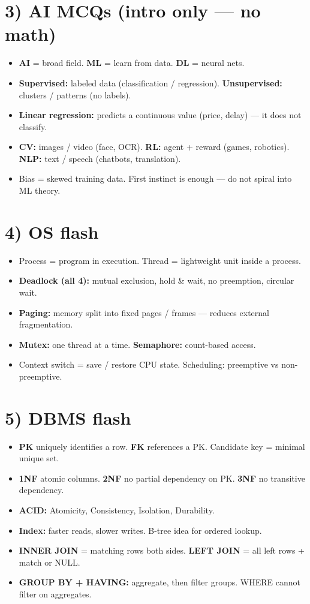 \documentclass[a4paper,9pt]{extarticle}
\begin{document}
\section{3) AI MCQs (intro only --- no math)}
\begin{itemize}
  \item \textbf{AI} = broad field. \textbf{ML} = learn from data. \textbf{DL} = neural nets.
  \item \textbf{Supervised:} labeled data (classification / regression). \textbf{Unsupervised:} clusters / patterns (no labels).
  \item \textbf{Linear regression:} predicts a continuous value (price, delay) --- it does not classify.
  \item \textbf{CV:} images / video (face, OCR). \textbf{RL:} agent + reward (games, robotics). \textbf{NLP:} text / speech (chatbots, translation).
  \item Bias = skewed training data. First instinct is enough --- do not spiral into ML theory.
\end{itemize}

\section{4) OS flash}
\begin{itemize}
  \item Process = program in execution. Thread = lightweight unit inside a process.
  \item \textbf{Deadlock (all 4):} mutual exclusion, hold \& wait, no preemption, circular wait.
  \item \textbf{Paging:} memory split into fixed pages / frames --- reduces external fragmentation.
  \item \textbf{Mutex:} one thread at a time. \textbf{Semaphore:} count-based access.
  \item Context switch = save / restore CPU state. Scheduling: preemptive vs non-preemptive.
\end{itemize}

\section{5) DBMS flash}
\begin{itemize}
  \item \textbf{PK} uniquely identifies a row. \textbf{FK} references a PK. Candidate key = minimal unique set.
  \item \textbf{1NF} atomic columns. \textbf{2NF} no partial dependency on PK. \textbf{3NF} no transitive dependency.
  \item \textbf{ACID:} Atomicity, Consistency, Isolation, Durability.
  \item \textbf{Index:} faster reads, slower writes. B-tree idea for ordered lookup.
  \item \textbf{INNER JOIN} = matching rows both sides. \textbf{LEFT JOIN} = all left rows + match or NULL.
  \item \textbf{GROUP BY + HAVING:} aggregate, then filter groups. WHERE cannot filter on aggregates.
\end{itemize}
\end{document}
